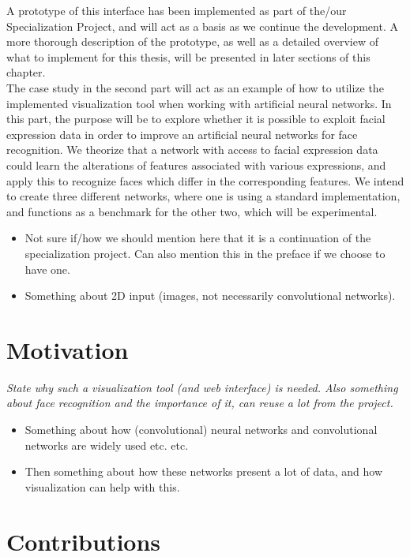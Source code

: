 \noindent A prototype of this interface has been implemented as part of the/our Specialization Project, and will act as a basis as we continue the development. A more thorough description of the prototype, as well as a detailed overview of what to implement for this thesis, will be presented in later sections of this chapter. \\

\noindent The case study in the second part will act as an example of how to utilize the implemented visualization tool when working with artificial neural networks. In this part, the purpose will be to explore whether it is possible to exploit facial expression data in order to improve an artificial neural networks for face recognition. We theorize that a network with access to facial expression data could learn the alterations of features associated with various expressions, and apply this to recognize faces which differ in the corresponding features. We intend to create three different networks, where one is using a standard implementation, and functions as a benchmark for the other two, which will be experimental.

\begin{itemize}
    \item Not sure if/how we should mention here that it is a continuation of the specialization project. Can also mention this in the preface if we choose to have one.
    \item Something about 2D input (images, not necessarily convolutional networks).
\end{itemize}

\section{Motivation}

\textit{State why such a visualization tool (and web interface) is needed. Also something about face recognition and the importance of it, can reuse a lot from the project.}

\begin{itemize}
    \item Something about how (convolutional) neural networks and convolutional networks are widely used etc. etc.
    \item Then something about how these networks present a lot of data, and how visualization can help with this.
\end{itemize}

\section{Contributions}

